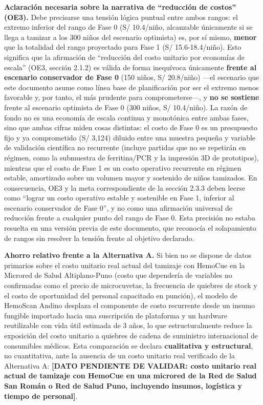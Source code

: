 \documentclass[11pt,a4paper]{article}
\begin{document}
\textbf{Aclaración necesaria sobre la narrativa de ``reducción de costos'' (OE3).} Debe precisarse una tensión lógica puntual entre ambos rangos: el extremo inferior del rango de Fase 0 (S/ 10.4/niño, alcanzable únicamente si se llega a tamizar a los 300 niños del escenario optimista) es, por sí mismo, \textbf{menor} que la totalidad del rango proyectado para Fase 1 (S/ 15.6-18.4/niño). Esto significa que la afirmación de ``reducción del costo unitario por economías de escala'' (OE3, sección 2.1.2) es válida de forma inequívoca únicamente \textbf{frente al escenario conservador de Fase 0} (150 niños, S/ 20.8/niño) ---el escenario que este documento asume como línea base de planificación por ser el extremo menos favorable y, por tanto, el más prudente para comprometerse---, y \textbf{no se sostiene} frente al escenario optimista de Fase 0 (300 niños, S/ 10.4/niño). La razón de fondo no es una economía de escala continua y monotónica entre ambas fases, sino que ambas cifras miden cosas distintas: el costo de Fase 0 es un presupuesto fijo y ya comprometido (S/ 3,124) diluido entre una muestra pequeña y variable de validación científica no recurrente (incluye partidas que no se repetirán en régimen, como la submuestra de ferritina/PCR y la impresión 3D de prototipos), mientras que el costo de Fase 1 es un costo operativo recurrente en régimen estable, amortizado sobre un volumen mayor y sostenido de niños tamizados. En consecuencia, OE3 y la meta correspondiente de la sección 2.3.3 deben leerse como ``lograr un costo operativo estable y sostenible en Fase 1, inferior al escenario conservador de Fase 0'', y no como una afirmación universal de reducción frente a cualquier punto del rango de Fase 0. Esta precisión no estaba resuelta en una versión previa de este documento, que reconocía el solapamiento de rangos sin resolver la tensión frente al objetivo declarado.

\textbf{Ahorro relativo frente a la Alternativa A.} Si bien no se dispone de datos primarios sobre el costo unitario real actual del tamizaje con HemoCue en la Microred de Salud Altiplano-Puno (costo que dependería de variables no confirmadas como el precio de microcuvetas, la frecuencia de quiebres de stock y el costo de oportunidad del personal capacitado en punción), el modelo de HemoScan Andino desplaza el componente de costo recurrente desde un insumo fungible importado hacia una suscripción de plataforma y un hardware reutilizable con vida útil estimada de 3 años, lo que estructuralmente reduce la exposición del costo unitario a quiebres de cadena de suministro internacional de consumibles médicos. Esta comparación se declara \textbf{cualitativa y estructural}, no cuantitativa, ante la ausencia de un costo unitario real verificado de la Alternativa A: \textbf{{[}DATO PENDIENTE DE VALIDAR: costo unitario real actual de tamizaje con HemoCue en una microred de la Red de Salud San Román o Red de Salud Puno, incluyendo insumos, logística y tiempo de personal{]}}.
\end{document}
